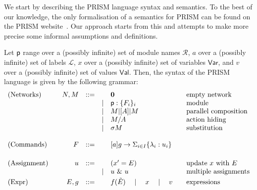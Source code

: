 We start by describing the PRISM language syntax and semantics. To the
best of our knowledge, the only formalisation of a semantics for PRISM
can be found on the PRISM website~\cite{prismemantics}. Our approach
starts from this and attempts to make more precise some informal
assumptions and definitions.

\smallskip

 Let $\textsf{p}$ range over a (possibly infinite) set of
module names $\mathcal R$, $a$ over a (possibly infinite) set of
labels $\mathcal L$, $x$ over a (possibly infinite) set of variables
$\mathsf{Var}$, and $v$ over a (possibly infinite) set of values
$\mathsf{Val}$. Then, the syntax of the PRISM language is given by the
following grammar:
\begin{displaymath}
  \begin{array}{lrlll@{\qquad}l}
    \text{(Networks)}  \quad
    & N, M  & ::=  &      & \CEnd & \text{empty network}\\
    &       &      & \mid & \role{p}:\{F_i\}_i & \text{module}\\
    &       &      & \mid & M \ppp A M & \text{parallel composition}\\
    &       &      & \mid & M/A        & \text{action hiding}\\
    &       &      & \mid & \sigma M   & \text{substitution}\\
    \\
    \text{(Commands)}  \quad
    & F     & ::=  &      & \command ag\lambda u
                                  & \text{} \\
    \\[1mm]
    \text{(Assignment)} \quad
    & u     & ::=  &      & (x' = E) & \text{update $x$ %
                                       with $E$}\\
    &       &      & \mid & u\ \&\ u   & \text{multiple assignments}
    \\[1mm]
    \text{(Expr)}\quad
    & E, g     & ::= &       & f(\tilde E)\quad\mid\quad x\quad\mid\quad v & \text{expressions}
  \end{array}
\end{displaymath}
